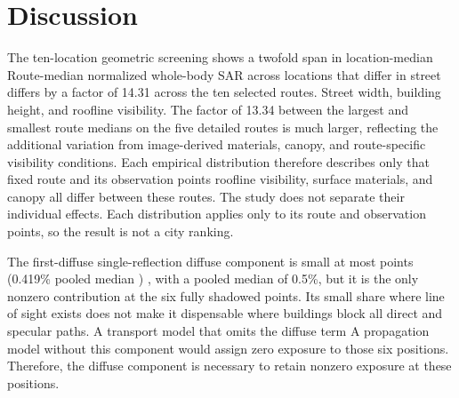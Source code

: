 \documentclass{IEEEoj} %
\providecommand{\DIFadd}[1]{{\protect\color{blue} \sf #1}} %
\providecommand{\DIFdel}[1]{{\protect\color{red} \scriptsize #1}} %
\providecommand{\DIFaddbegin}{} %
\providecommand{\DIFaddend}{} %
\providecommand{\DIFdelbegin}{} %
\providecommand{\DIFdelend}{} %
\begin{document}
\section{Discussion}
\label{sec:discussion}

\DIFdelbegin \DIFdel{The ten-location geometric screening shows a twofold span in location-median
}\DIFdelend \DIFaddbegin \DIFadd{Route-median normalized }\DIFaddend whole-body SAR \DIFdelbegin \DIFdel{across locations that differ in street }\DIFdelend \DIFaddbegin \DIFadd{differs by a factor of 14.31 across the
ten selected routes. Street }\DIFaddend width, building height, \DIFdelbegin \DIFdel{and roofline visibility. The factor of 13.34 between the largest and smallest
route medians on the five detailed routes is much larger,
reflecting the
additional variation from image-derived materials, canopy, and route-specific
visibility conditions. Each empirical distribution therefore describes only that fixed route and its observation points}\DIFdelend \DIFaddbegin \DIFadd{roofline visibility,
surface materials, and canopy all differ between these routes. The study does
not separate their individual effects. Each distribution applies only to its
route and observation points, so the result is not a city ranking}\DIFaddend .

The \DIFdelbegin \DIFdel{first-diffuse }\DIFdelend \DIFaddbegin \DIFadd{single-reflection diffuse }\DIFaddend component is small at most points\DIFdelbegin \DIFdel{(0.419\% pooled
median )}\DIFdelend \DIFaddbegin \DIFadd{, with a pooled
median of 0.5\%}\DIFaddend , but it is the only nonzero contribution at the six fully
shadowed points. \DIFdelbegin \DIFdel{Its
small share where line of sight exists does not make it dispensable where
buildings block all direct and specular paths. A transport model that omits the
diffuse term }\DIFdelend \DIFaddbegin \DIFadd{A propagation model without this component }\DIFaddend would assign zero
exposure to those \DIFdelbegin \DIFdel{six }\DIFdelend \DIFaddbegin \DIFadd{positions. Therefore, the diffuse component is necessary to
retain nonzero exposure at these }\DIFaddend positions.
\end{document}

